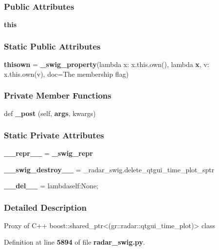 \subsubsection*{Public Attributes}
\begin{DoxyCompactItemize}
\item 
{\bf this}
\end{DoxyCompactItemize}
\subsubsection*{Static Public Attributes}
\begin{DoxyCompactItemize}
\item 
{\bf thisown} = {\bf \+\_\+swig\+\_\+property}(lambda x\+: x.\+this.\+own(), lambda {\bf x}, v\+: x.\+this.\+own(v), doc=\textquotesingle{}The membership flag\textquotesingle{})
\end{DoxyCompactItemize}
\subsubsection*{Private Member Functions}
\begin{DoxyCompactItemize}
\item 
def {\bf \+\_\+post} (self, {\bf args}, kwargs)
\end{DoxyCompactItemize}
\subsubsection*{Static Private Attributes}
\begin{DoxyCompactItemize}
\item 
{\bf \+\_\+\+\_\+repr\+\_\+\+\_\+} = {\bf \+\_\+swig\+\_\+repr}
\item 
{\bf \+\_\+\+\_\+swig\+\_\+destroy\+\_\+\+\_\+} = \+\_\+radar\+\_\+swig.\+delete\+\_\+qtgui\+\_\+time\+\_\+plot\+\_\+sptr
\item 
{\bf \+\_\+\+\_\+del\+\_\+\+\_\+} = lambdaself\+:\+None;
\end{DoxyCompactItemize}


\subsubsection{Detailed Description}
\begin{DoxyVerb}Proxy of C++ boost::shared_ptr<(gr::radar::qtgui_time_plot)> class\end{DoxyVerb}
 

Definition at line {\bf 5894} of file {\bf radar\+\_\+swig.\+py}.



